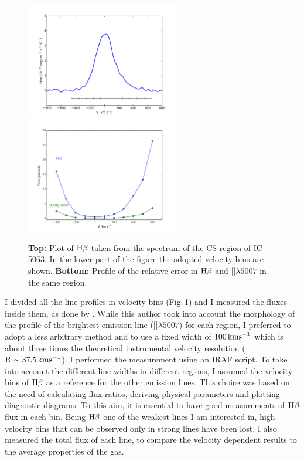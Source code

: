 \documentclass[../main.tex]{subfiles}
\begin{document}
\begin{figure}
\centering
\includegraphics[width=0.60\textwidth]{images/paper1/IC5063_bins.pdf} \\
\includegraphics[width=0.60\textwidth]{images/paper1/errors.pdf}
\caption[]{\textbf{Top:} Plot of $\Hb$ taken from the spectrum of the CS region of IC\,5063. In the lower part of the figure the adopted velocity bins are shown. \textbf{Bottom:} Profile of the relative error in $\Hb$ and []$\lambda5007$ in the same region.}
\label{fig:bins}
\end{figure}

I divided all the line profiles in velocity bins (Fig.\,\ref{fig:bins}) and I measured the fluxes inside them, as done by \citet{Ozaki09}.
While this author took into account the morphology of the profile of the brightest emission line ([]$\lambda5007$) for each region, I preferred to adopt a less arbitrary method and to use a fixed width of $100\,\si{\kms}$ which is about three times the theoretical instrumental velocity resolution ($\rm R\sim 37.5\,\si{\kms}$).
I performed the measurement using an IRAF script. 
To take into account the different line widths in different regions, I assumed the velocity bins of $\Hb$ as a reference for the other emission lines. 
This choice was based on the need of calculating flux ratios, deriving physical parameters and plotting diagnostic diagrams. 
To this aim, it is essential to have good measurements of $\Hb$ flux in each bin. 
Being $\Hb$ one of the weakest lines I am interested in, high-velocity bins that can be observed only in strong lines have been lost.
I also measured the total flux of each line, to compare the velocity dependent results to the average properties of the gas.
\end{document}
